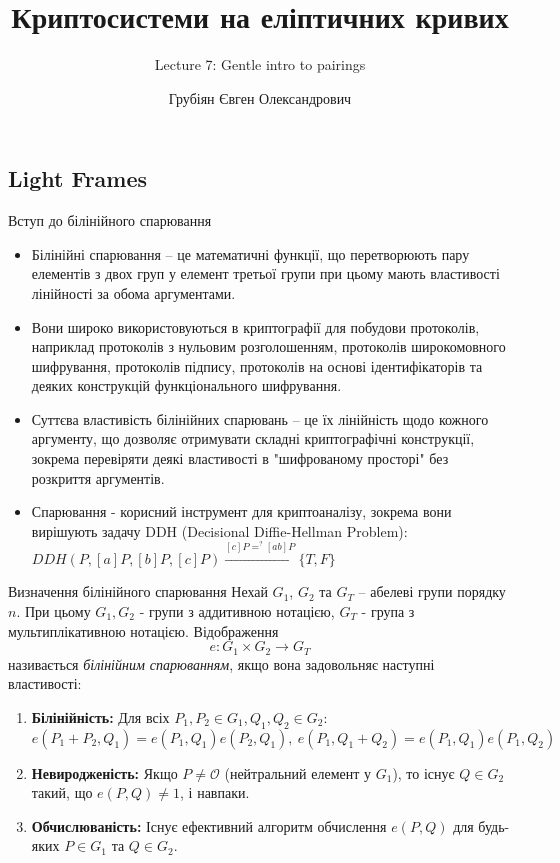 \documentclass[9pt]{beamer}
\title{Криптосистеми на еліптичних кривих} %
\subtitle{Lecture 7: Gentle intro to pairings}
\author{Грубіян Євген Олександрович}
\begin{document}
  \frame{\maketitle}


  \begin{darkframes}
      
    \section{Light Frames}


\begin{frame}{Вступ до білінійного спарювання}
  \begin{itemize}
    \item Білінійні спарювання – це математичні функції, що перетворюють пару елементів з двох груп у елемент третьої групи при цьому мають властивості лінійності за обома аргументами.
    \item Вони широко використовуються в криптографії для побудови протоколів, наприклад протоколів з нульовим розголошенням, протоколів широкомовного шифрування, протоколів підпису, протоколів на основі ідентифікаторів та деяких конструкцій функціонального шифрування.
    \item Суттєва властивість білінійних спарювань – це їх лінійність щодо кожного аргументу, що дозволяє отримувати складні криптографічні конструкції, зокрема перевіряти деякі властивості в "шифрованому просторі" без розкриття аргументів.
    \item Спарювання - корисний інструмент для криптоаналізу, зокрема вони вирішують задачу DDH (Decisional Diffie-Hellman Problem): $DDH(P,[a]P, [b]P, [c]P) \xrightarrow{[c]P =^? [ab]P} \{T,F\}$
  \end{itemize}
\end{frame}

\begin{frame}{Визначення білінійного спарювання}
  Нехай \(G_1\), \(G_2\) та \(G_T\) – абелеві групи порядку $n$. При цьому $G_1, G_2$ - групи з аддитивною нотацією, $G_T$ - група з мультиплікативною нотацією. Відображення
  \[
  e : G_1 \times G_2 \to G_T
  \]
  називається \emph{білінійним спарюванням}, якщо вона задовольняє наступні властивості:
  \begin{enumerate}
    \item \textbf{Білінійність:} Для всіх $P_1, P_2 \in G_1, Q_1, Q_2 \in G_2$: 
    $$e(P_1 + P_2, Q_1) = e(P_1,Q_1)e(P_2,Q_1),\ e(P_1, Q_1+Q_2)=e(P_1,Q_1)e(P_1,Q_2) $$
    \item \textbf{Невиродженість:} Якщо \(P \neq \mathcal{O}\) (нейтральний елемент у \(G_1\)), то існує \(Q \in G_2\) такий, що \(e(P,Q) \neq 1\), і навпаки.
    \item \textbf{Обчислюваність:} Існує ефективний алгоритм обчислення \(e(P,Q)\) для будь-яких \(P \in G_1\) та \(Q \in G_2\).
  \end{enumerate}



\end{frame}
\end{darkframes}
\end{document}
